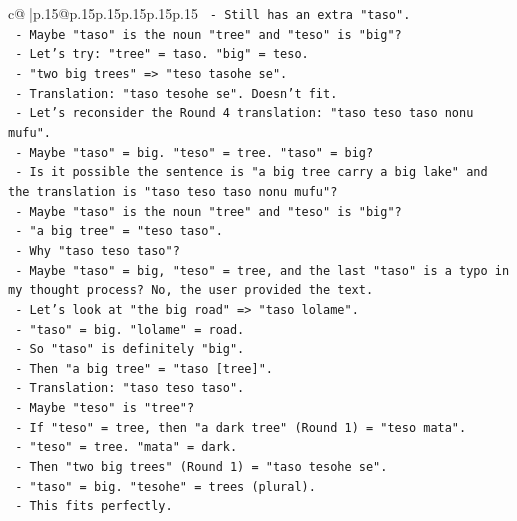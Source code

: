\documentclass{article}
\begin{document}
{\begin{supertabular}{c@{$\;$}|p{.15\linewidth}@{}p{.15\linewidth}p{.15\linewidth}p{.15\linewidth}p{.15\linewidth}p{.15\linewidth}}
{{{\texttt{              {-} Still has an extra "taso".} \\
\texttt{              {-} Maybe "taso" is the noun "tree" and "teso" is "big"?} \\
\texttt{              {-} Let's try: "tree" = taso. "big" = teso.} \\
\texttt{              {-} "two big trees" => "teso tasohe se".} \\
\texttt{              {-} Translation: "taso tesohe se". Doesn't fit.} \\
\texttt{            {-} Let's reconsider the Round 4 translation: "taso teso taso nonu mufu".} \\
\texttt{              {-} Maybe "taso" = big. "teso" = tree. "taso" = big?} \\
\texttt{              {-} Is it possible the sentence is "a big tree carry a big lake" and the translation is "taso teso taso nonu mufu"?} \\
\texttt{              {-} Maybe "taso" is the noun "tree" and "teso" is "big"?} \\
\texttt{              {-} "a big tree" = "teso taso".} \\
\texttt{              {-} Why "taso teso taso"?} \\
\texttt{              {-} Maybe "taso" = big, "teso" = tree, and the last "taso" is a typo in my thought process? No, the user provided the text.} \\
\texttt{              {-} Let's look at "the big road" => "taso lolame".} \\
\texttt{                {-} "taso" = big. "lolame" = road.} \\
\texttt{              {-} So "taso" is definitely "big".} \\
\texttt{              {-} Then "a big tree" = "taso {[}tree{]}".} \\
\texttt{              {-} Translation: "taso teso taso".} \\
\texttt{              {-} Maybe "teso" is "tree"?} \\
\texttt{              {-} If "teso" = tree, then "a dark tree" (Round 1) = "teso mata".} \\
\texttt{                {-} "teso" = tree. "mata" = dark.} \\
\texttt{              {-} Then "two big trees" (Round 1) = "taso tesohe se".} \\
\texttt{                {-} "taso" = big. "tesohe" = trees (plural).} \\
\texttt{              {-} This fits perfectly.} \\
}}}
\end{supertabular}}
\end{document}
